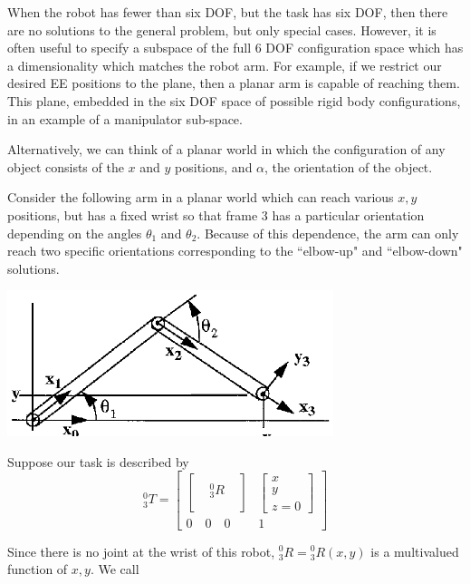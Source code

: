 When the robot has fewer than six DOF, but the task has six DOF, then there are no solutions to the general problem, but only special cases. However, it is often useful to specify a subspace of the full 6 DOF configuration space which has a dimensionality which matches the robot arm.  For example, if we restrict our desired EE positions to the plane, then a planar arm is capable of reaching them. This plane, embedded in the six DOF space of possible rigid body configurations, in an example of a manipulator sub-space.

Alternatively, we can think of a planar world in which the configuration of any object consists of the $x$ and $y$ positions, and $\alpha$, the orientation of the object.

\begin{ExampleSmall}\label{PlanarManipSS}
Consider the following arm in a planar world which can reach various $x, y$ positions, but has a fixed wrist so that frame 3 has a particular orientation depending on the angles $\theta_1$ and $\theta_2$. Because of this dependence, the arm can only reach two specific orientations corresponding to the ``elbow-up" and ``elbow-down" solutions.

\includegraphics[width=3.75in]{figs04/00437.eps}


Suppose our task is described by
\[
^0_3T =
\begin{bmatrix}
\begin{bmatrix}  &  &  \\  & ^0_3R&  \\ & & \\ \end{bmatrix}      &
 \begin{bmatrix} x \\ y \\ z=0 \end{bmatrix}            \\
 0 \quad 0 \quad 0      &   1
\end{bmatrix}
\]

Since there is no joint at the wrist of this robot, ${^0_3R} = {^0_3R}(x,y)$ is a multivalued function of $x, y$.   We call


\end{ExampleSmall}
